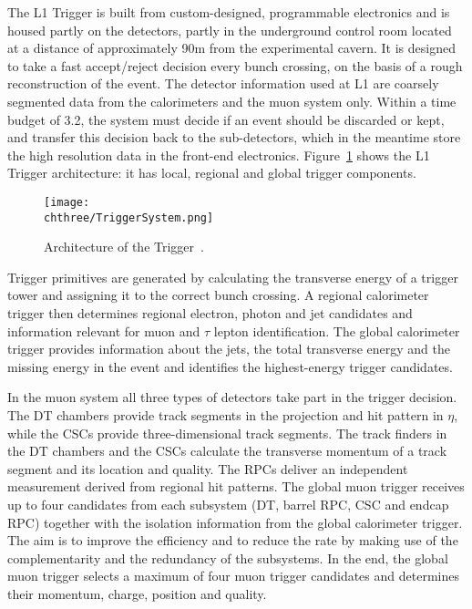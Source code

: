 The L1 Trigger is built from custom-designed, programmable electronics and is housed partly on the detectors, partly in the underground control room located at a distance of approximately 90\unit{m} from the experimental cavern. It is designed to take a fast accept/reject decision every bunch crossing, on the basis of a rough reconstruction of the event. 
The detector information used at L1 are coarsely segmented data from the calorimeters and the muon system only. Within a time budget of 3.2\mus, the system must decide if an event should be discarded or kept, and transfer this decision back to the sub-detectors, which in the meantime store the high resolution data in the front-end electronics. Figure~\ref{fig:TriggerSystem} shows the L1 Trigger architecture: it has local, regional and global trigger components. 

\begin{figure}[!htb]
 \begin{center}
  \texttt{[image: \\chthree/TriggerSystem.png]}
 \end{center}
 \caption{Architecture of the \Lone Trigger~\cite{Chatrchyan:2008zzk}.}
 \label{fig:TriggerSystem}
\end{figure}

Trigger primitives are generated by calculating the transverse energy of a trigger tower and assigning it to the correct bunch crossing. A regional calorimeter trigger then determines regional electron, photon and jet candidates and information relevant for muon and $\tau$ lepton identification. The global calorimeter trigger provides information about the jets, the total transverse energy and the missing energy in the event and identifies the highest-energy trigger candidates.

In the muon system all three types of detectors take part in the trigger decision. The DT chambers provide track segments in the projection and hit pattern in $\eta$, while the CSCs provide three-dimensional track segments. The track finders in the DT chambers and the CSCs calculate the transverse momentum of a track segment and its location and quality. The RPCs deliver an independent measurement derived from regional hit patterns. The global muon trigger receives up to four candidates from each subsystem (DT, barrel RPC, CSC and endcap RPC) together with the isolation information from the global calorimeter trigger. The aim is to improve the efficiency and to reduce the rate by making use of the complementarity and the redundancy of the subsystems. In the end, the global muon trigger selects a maximum of four muon trigger candidates and determines their momentum, charge, position and quality.

